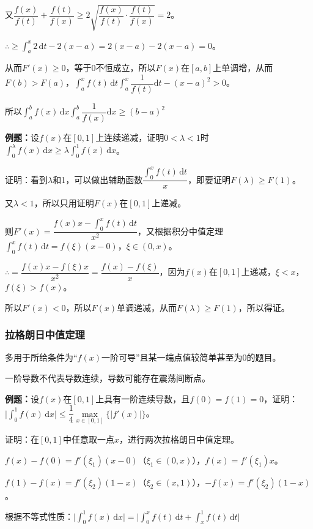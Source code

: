 \documentclass[UTF8, 12pt]{ctexart}
\begin{document}
又$\dfrac{f(x)}{f(t)}+\dfrac{f(t)}{f(x)}\geqslant2\sqrt{\dfrac{f(x)}{f(t)}\cdot\dfrac{f(t)}{f(x)}}=2$。

$\therefore\geqslant\int_a^x2\,\textrm{d}t-2(x-a)=2(x-a)-2(x-a)=0$。

从而$F'(x)\geqslant0$，等于0不恒成立，所以$F(x)$在$[a,b]$上单调增，从而$F(b)>F(a)$，$\displaystyle{\int_a^xf(t)\,\textrm{d}t\int_a^x\dfrac{1}{f(t)}\textrm{d}t-(x-a)^2}>0$。

所以$\displaystyle{\int_a^bf(x)\,\textrm{d}x\int_a^b\dfrac{1}{f(x)}\textrm{d}x}\geqslant(b-a)^2$

\textbf{例题：}设$f(x)$在$[0,1]$上连续递减，证明$0<\lambda<1$时$\int_0^\lambda f(x)\,\textrm{d}x\geqslant\lambda\int_0^1f(x)\,\textrm{d}x$。

证明：看到$\lambda$和1，可以做出辅助函数$\dfrac{\int_0^xf(t)\,\textrm{d}t}{x}$，即要证明$F(\lambda)\geqslant F(1)$。

又$\lambda<1$，所以只用证明$F(x)$在$[0,1]$上递减。

则$F'(x)=\dfrac{f(x)x-\int_0^xf(t)\,\textrm{d}t}{x^2}$，又根据积分中值定理$\int_0^xf(t)\,\textrm{d}t=f(\xi)(x-0)$，$\xi\in(0,x)$。

$\therefore=\dfrac{f(x)x-f(\xi)x}{x^2}=\dfrac{f(x)-f(\xi)}{x}$，因为$f(x)$在$[0,1]$上递减，$\xi<x$，$f(\xi)>f(x)$。

所以$F'(x)<0$，所以$F(x)$单调递减，从而$F(\lambda)\geqslant F(1)$，所以得证。

\subsubsection{拉格朗日中值定理}

多用于所给条件为“$f(x)$一阶可导”且某一端点值较简单甚至为0的题目。

一阶导数不代表导数连续，导数可能存在震荡间断点。

\textbf{例题：}设$f(x)$在$[0,1]$上具有一阶连续导数，且$f(0)=f(1)=0$，证明：$\vert\int_0^1f(x)\,\textrm{d}x\vert\leqslant\dfrac{1}{4}\max\limits_{x\in[0,1]}\{\vert f'(x)\vert\}$。

证明：在$[0,1]$中任意取一点$x$，进行两次拉格朗日中值定理。

$f(x)-f(0)=f'(\xi_1)(x-0)$（$\xi_1\in(0,x)$），$f(x)=f'(\xi_1)x$。

$f(1)-f(x)=f'(\xi_2)(1-x)$（$\xi_2\in(x,1)$），$-f(x)=f'(\xi_2)(1-x)$。

根据不等式性质：$\vert\int_0^1f(x)\,\textrm{d}x\vert=\vert\int_0^xf(t)\,\textrm{d}t+\int_x^1f(t)\,\textrm{d}t\vert$
\end{document}
